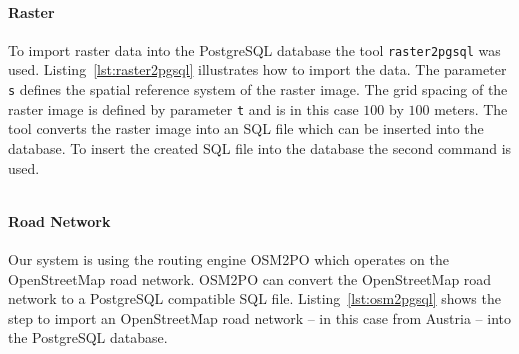 \documentclass[master,english]{hgbthesis}
\begin{document}
\paragraph{Raster}
To import raster data into the PostgreSQL database the tool \verb|raster2pgsql| was used. Listing~\ref{lst:raster2pgsql} illustrates how to import the data. The parameter \verb|s| defines the spatial reference system of the raster image. The grid spacing of the raster image is defined by parameter \verb|t| and is in this case $100$ by $100$ meters. The tool converts the raster image into an SQL file which can be inserted into the database. To insert the created SQL file into the database the second command is used.
\begin{lstlisting}[style=BashInputStyle,caption={Import raster data into PostgreSQL database},label={lst:raster2pgsql}]
\end{lstlisting}
\paragraph{Road Network}
Our system is using the routing engine OSM2PO which operates on the OpenStreetMap road network. OSM2PO can convert the OpenStreetMap road network to a PostgreSQL compatible SQL file. Listing~\ref{lst:osm2pgsql} shows the step to import an OpenStreetMap road network -- in this case from Austria -- into the PostgreSQL  database.
\begin{lstlisting}[style=BashInputStyle,caption={Import OpenStreetmap data into PostgreSQL database},label={lst:osm2pgsql}]
\end{lstlisting}
\end{document}
